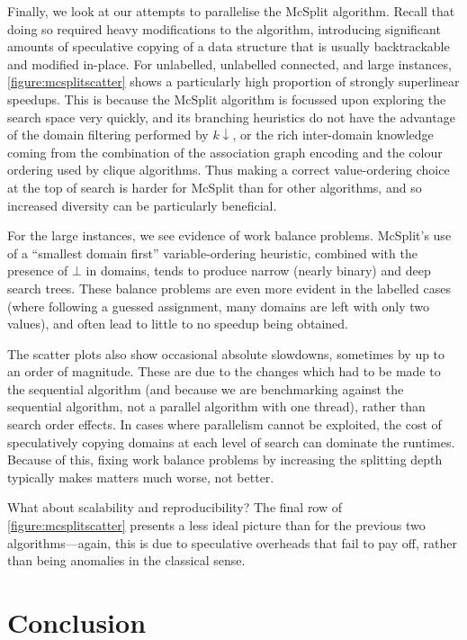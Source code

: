\documentclass[sigconf]{acmart}
\begin{document}
Finally, we look at our attempts to parallelise the McSplit algorithm. Recall that doing so required
heavy modifications to the algorithm, introducing significant amounts of speculative copying of a
data structure that is usually backtrackable and modified in-place. For unlabelled, unlabelled
connected, and large instances, \cref{figure:mcsplitscatter} shows a particularly high proportion of
strongly superlinear speedups. This is because the McSplit algorithm is focussed upon
exploring the search space very quickly, and its branching heuristics do not have the advantage of
the domain filtering performed by $k{\downarrow}$, or the rich inter-domain knowledge coming from
the combination of the association graph encoding and the colour ordering used by clique algorithms.
Thus making a correct value-ordering choice at the top of search is harder for McSplit than for
other algorithms, and so increased diversity can be particularly beneficial.

For the large instances, we see evidence of work balance problems. McSplit's use of a ``smallest
domain first'' variable-ordering heuristic, combined with the presence of $\bot$ in domains, tends
to produce narrow (nearly binary) and deep search trees. These balance problems are even more
evident in the labelled cases (where following a guessed assignment, many domains are left with only
two values), and often lead to little to no speedup being obtained.

The scatter plots also show occasional absolute slowdowns, sometimes by up to an order of magnitude.
These are due to the changes which had to be made to the sequential algorithm (and because we are
benchmarking against the sequential algorithm, not a parallel algorithm with one thread), rather
than search order effects. In cases where parallelism cannot be exploited, the cost of speculatively
copying domains at each level of search can dominate the runtimes. Because of this, fixing work
balance problems by increasing the splitting depth typically makes matters much worse, not better.

What about scalability and reproducibility? The final row of \cref{figure:mcsplitscatter} presents a
less ideal picture than for the previous two algorithms---again, this is due to speculative
overheads that fail to pay off, rather than being anomalies in the classical sense.

\section{Conclusion}
\end{document}
